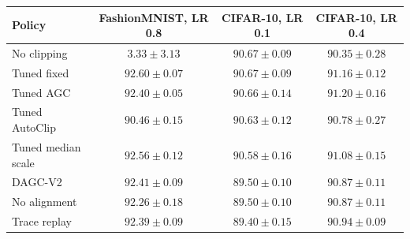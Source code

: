 \begin{tabular}{lccc}
\toprule
Policy & FashionMNIST, LR 0.8 & CIFAR-10, LR 0.1 & CIFAR-10, LR 0.4 \\
\midrule
No clipping & $3.33\pm3.13$ & $90.67\pm0.09$ & $90.35\pm0.28$ \\
Tuned fixed & $92.60\pm0.07$ & $90.67\pm0.09$ & $91.16\pm0.12$ \\
Tuned AGC & $92.40\pm0.05$ & $90.66\pm0.14$ & $91.20\pm0.16$ \\
Tuned AutoClip & $90.46\pm0.15$ & $90.63\pm0.12$ & $90.78\pm0.27$ \\
Tuned median scale & $92.56\pm0.12$ & $90.58\pm0.16$ & $91.08\pm0.15$ \\
DAGC-V2 & $92.41\pm0.09$ & $89.50\pm0.10$ & $90.87\pm0.11$ \\
No alignment & $92.26\pm0.18$ & $89.50\pm0.10$ & $90.87\pm0.11$ \\
Trace replay & $92.39\pm0.09$ & $89.40\pm0.15$ & $90.94\pm0.09$ \\
\bottomrule
\end{tabular}

